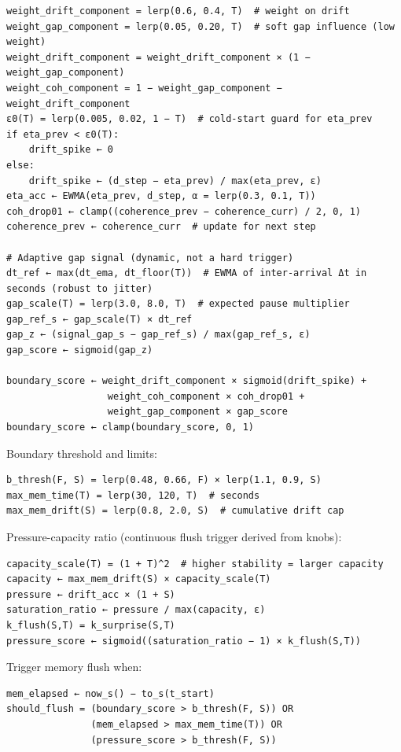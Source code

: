 \documentclass[
  letterpaper,
  DIV=11,
  numbers=noendperiod]{scrartcl}
\begin{document}
\begin{verbatim}
weight_drift_component = lerp(0.6, 0.4, T)  # weight on drift
weight_gap_component = lerp(0.05, 0.20, T)  # soft gap influence (low weight)
weight_drift_component = weight_drift_component × (1 − weight_gap_component)
weight_coh_component = 1 − weight_gap_component − weight_drift_component
ε0(T) = lerp(0.005, 0.02, 1 − T)  # cold-start guard for eta_prev
if eta_prev < ε0(T):
    drift_spike ← 0
else:
    drift_spike ← (d_step − eta_prev) / max(eta_prev, ε)
eta_acc ← EWMA(eta_prev, d_step, α = lerp(0.3, 0.1, T))
coh_drop01 ← clamp((coherence_prev − coherence_curr) / 2, 0, 1)
coherence_prev ← coherence_curr  # update for next step

# Adaptive gap signal (dynamic, not a hard trigger)
dt_ref ← max(dt_ema, dt_floor(T))  # EWMA of inter-arrival Δt in seconds (robust to jitter)
gap_scale(T) = lerp(3.0, 8.0, T)  # expected pause multiplier
gap_ref_s ← gap_scale(T) × dt_ref
gap_z ← (signal_gap_s − gap_ref_s) / max(gap_ref_s, ε)
gap_score ← sigmoid(gap_z)

boundary_score ← weight_drift_component × sigmoid(drift_spike) +
                  weight_coh_component × coh_drop01 +
                  weight_gap_component × gap_score
boundary_score ← clamp(boundary_score, 0, 1)
\end{verbatim}

Boundary threshold and limits:

\begin{verbatim}
b_thresh(F, S) = lerp(0.48, 0.66, F) × lerp(1.1, 0.9, S)
max_mem_time(T) = lerp(30, 120, T)  # seconds
max_mem_drift(S) = lerp(0.8, 2.0, S)  # cumulative drift cap
\end{verbatim}

Pressure-capacity ratio (continuous flush trigger derived from knobs):

\begin{verbatim}
capacity_scale(T) = (1 + T)^2  # higher stability = larger capacity
capacity ← max_mem_drift(S) × capacity_scale(T)
pressure ← drift_acc × (1 + S)
saturation_ratio ← pressure / max(capacity, ε)
k_flush(S,T) = k_surprise(S,T)
pressure_score ← sigmoid((saturation_ratio − 1) × k_flush(S,T))
\end{verbatim}

Trigger memory flush when:

\begin{verbatim}
mem_elapsed ← now_s() − to_s(t_start)
should_flush = (boundary_score > b_thresh(F, S)) OR
               (mem_elapsed > max_mem_time(T)) OR
               (pressure_score > b_thresh(F, S))
\end{verbatim}
\end{document}
